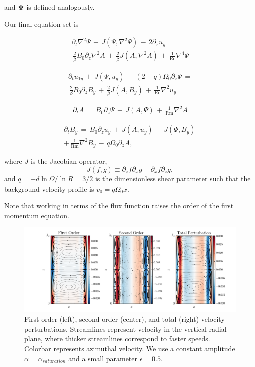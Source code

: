 \documentclass{emulateapj}
\newcommand{\beq}{\begin{equation}}
\newcommand{\eeq}{\end{equation}}
\newcommand\reye{\mathrm{Re}}
\newcommand\reym{\mathrm{Rm}}
\begin{document}
and $\mathbf{\Psi}$ is defined analogously.

Our final equation set is

\begin{multline}
\label{eqset1}
\partial_t \nabla^2 \Psi \, + \, J\left(\Psi, \nabla^2 \Psi\right) \, - \, 2 \partial_z u_{y} \, = \\
\, \frac{2}{\beta} B_0 \partial_z \nabla^2 A \, + \, \frac{2}{\beta}J\left(A, \nabla^2 A \right) \, + \, \frac{1}{\reye}\nabla^4 \Psi
\end{multline}

\begin{multline}
\label{eqset2}
\partial_t u_{1y} \, + \, J\left(\Psi, u_{y}\right) \, + \, \left(2 - q\right) \Omega_0 \partial_z \Psi \, = \\
\, \frac{2}{\beta}B_0\partial_z B_{y} \, + \, \frac{2}{\beta} J\left(A, B_{y}\right) \, + \, \frac{1}{\reye} \nabla^2 u_{y}
\end{multline}

\begin{multline}
\label{eqset3}
\partial_t A \, = \, B_0 \partial_z \Psi \, + \, J\left(A, \Psi\right) \, + \, \frac{1}{\reym} \nabla^2 A
\end{multline}

\begin{multline}
\label{eqset4}
\partial_t B_{y} \, = \, B_0 \partial_z u_{y} \, + \, J\left(A, u_{y}\right) \, - \, J\left(\Psi, B_{y}\right) \, \\
+ \, \frac{1}{\reym} \nabla^2 B_{y}  \, - \, q \Omega_0 \partial_z A,
\end{multline}

where $J$ is the Jacobian operator, 
\beq
J\left(f, g\right) \equiv \partial_z f\partial_x g - \partial_x f \partial_z g,
\eeq  
and $q = - d \ln \Omega/ \ln R = 3/2$ is the dimensionless shear parameter such that the background velocity profile is $v_0 = q \Omega_0 x$.

Note that working in terms of the flux function raises the order of the first momentum equation.

\begin{figure}
\centering
\includegraphics[width=\textwidth]{../figures/thingap_streamfuncs_velocity_Pm_1E-3.png}%
\caption{First order (left), second order (center), and total (right) velocity perturbations. Streamlines represent velocity in the vertical-radial plane, where thicker streamlines correspond to faster speeds. Colorbar represents azimuthal velocity. We use a constant amplitude $\alpha = \alpha_{saturation}$ and a small parameter $\epsilon = 0.5$.}\label{fig:allorders_velocity}
\end{figure}
\end{document}
